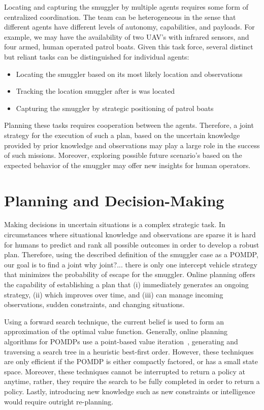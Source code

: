 \documentclass[conference]{IEEEtran}
\begin{document}
Locating and capturing the smuggler by multiple agents requires some form of centralized coordination. The team can be heterogeneous in the sense that different agents have different levels of autonomy, capabilities, and payloads. For example, we may have the availability of two UAV's with infrared sensors, and four armed, human operated patrol boats. Given this task force, several distinct but reliant tasks can be distinguished for individual agents:
\begin{itemize}
\item Locating the smuggler based on its most likely location and observations
\item Tracking the location smuggler after is was located
\item Capturing the smuggler by strategic positioning of patrol boats
\end{itemize}
Planning these tasks requires cooperation between the agents. Therefore, a joint strategy for the execution of such a plan, based on the uncertain knowledge provided by prior knowledge and observations may play a large role in the success of such missions. Moreover, exploring possible future scenario's based on the expected behavior of the smuggler may offer new insights for human operators.

\section{Planning and Decision-Making}
\label{sec:ma-dec-mak}

Making decisions in uncertain situations is a complex strategic task. In circumstances where situational knowledge and observations are sparse it is hard for humans to predict and rank all possible outcomes in order to develop a robust plan. Therefore, using the described definition of the smuggler case as a POMDP, our goal is to find a joint {\red why joint?... there is only one intercept vehicle} strategy that minimizes the probability of escape for the smuggler. Online planning offers the capability of establishing a plan that (i) immediately generates an ongoing strategy, (ii) which improves over time, and (iii) can manage incoming observations, sudden constraints, and changing situations. 

Using a forward search technique, the current belief is used to form an approximation of the optimal value function. Generally, online planning algorithms for POMDPs use a point-based value iteration~\cite{pineau2006anytime,ross2008online}, generating and traversing a search tree in a heuristic best-first order. However, these techniques are only efficient if the POMDP is either compactly factored, or has a small state space. Moreover, these techniques cannot be interrupted to return a policy at anytime, rather, they require the search to be fully completed in order to return a policy. Lastly, introducing new knowledge such as new constraints or intelligence would require outright re-planning.
\end{document}
